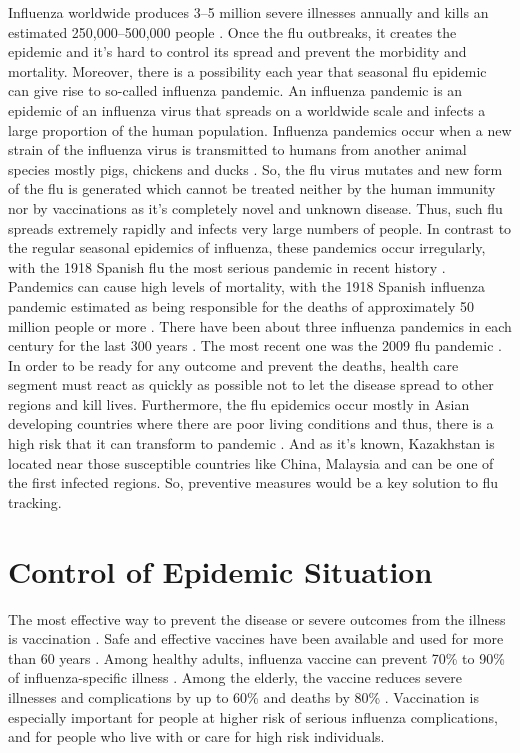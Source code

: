 Influenza worldwide produces 3–5 million severe illnesses annually and kills an estimated 250,000–500,000 people \cite{per2}. Once the flu outbreaks, it creates the epidemic and it’s hard to control its spread and prevent the morbidity and mortality. Moreover, there is a possibility each year that seasonal flu epidemic can give rise to so-called influenza pandemic. An influenza pandemic is an epidemic of an influenza virus that spreads on a worldwide scale and infects a large proportion of the human population.\cite{per3} Influenza pandemics occur when a new strain of the influenza virus is transmitted to humans from another animal species mostly pigs, chickens and ducks \cite{per3}. So, the flu virus mutates and new form of the flu is generated which cannot be treated neither by the human immunity nor by vaccinations as it’s completely novel and unknown disease. Thus, such flu spreads extremely rapidly and infects very large numbers of people. In contrast to the regular seasonal epidemics of influenza, these pandemics occur irregularly, with the 1918 Spanish flu the most serious pandemic in recent history \cite{per3}. Pandemics can cause high levels of mortality, with the 1918 Spanish influenza pandemic estimated as being responsible for the deaths of approximately 50 million people or more \cite{per3}. There have been about three influenza pandemics in each century for the last 300 years \cite{per4}. The most recent one was the 2009 flu pandemic \cite{per4}. In order to be ready for any outcome and prevent the deaths, health care segment must react as quickly as possible not to let the disease spread to other regions and kill lives. Furthermore, the flu epidemics occur mostly in Asian developing countries where there are poor living conditions and thus, there is a high risk that it can transform to pandemic \cite{per4}. And as it’s known, Kazakhstan is located near those susceptible countries like China, Malaysia and can be one of the first infected regions. So, preventive measures would be a key solution to flu tracking.

\section{Control of Epidemic Situation}

The most effective way to prevent the disease or severe outcomes from the illness is vaccination \cite{per1}. Safe and effective vaccines have been available and used for more than 60 years \cite{per1}. Among healthy adults, influenza vaccine can prevent 70\% to 90\% of influenza-specific illness \cite{per1}. Among the elderly, the vaccine reduces severe illnesses and complications by up to 60\% and deaths by 80\% \cite{per1}. Vaccination is especially important for people at higher risk of serious influenza complications, and for people who live with or care for high risk individuals.

